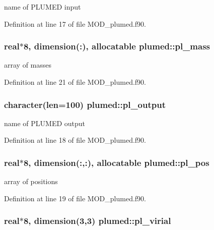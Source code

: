 name of P\-L\-U\-M\-E\-D input 



Definition at line 17 of file M\-O\-D\-\_\-plumed.\-f90.

\hypertarget{classplumed_aa02a55eef8aee0ddceb17c8b9dcf40c2}{
\subsubsection[{pl\-\_\-mass}]{\setlength{\rightskip}{0pt plus 5cm}real$\ast$8, dimension(\-:), allocatable plumed\-::pl\-\_\-mass}}\label{classplumed_aa02a55eef8aee0ddceb17c8b9dcf40c2}


array of masses 



Definition at line 21 of file M\-O\-D\-\_\-plumed.\-f90.

\hypertarget{classplumed_a2318a38b3aa942f80ae7dbe6b2c3f240}{
\subsubsection[{pl\-\_\-output}]{\setlength{\rightskip}{0pt plus 5cm}character(len=100) plumed\-::pl\-\_\-output}}\label{classplumed_a2318a38b3aa942f80ae7dbe6b2c3f240}


name of P\-L\-U\-M\-E\-D output 



Definition at line 18 of file M\-O\-D\-\_\-plumed.\-f90.

\hypertarget{classplumed_a12c6013d273e295dc9e85bd9521256be}{
\subsubsection[{pl\-\_\-pos}]{\setlength{\rightskip}{0pt plus 5cm}real$\ast$8, dimension(\-:,\-:), allocatable plumed\-::pl\-\_\-pos}}\label{classplumed_a12c6013d273e295dc9e85bd9521256be}


array of positions 



Definition at line 19 of file M\-O\-D\-\_\-plumed.\-f90.

\hypertarget{classplumed_a96e7d3b44d60f89f9d46d3c51c4c2ecf}{
\subsubsection[{pl\-\_\-virial}]{\setlength{\rightskip}{0pt plus 5cm}real$\ast$8, dimension(3,3) plumed\-::pl\-\_\-virial}}\label{classplumed_a96e7d3b44d60f89f9d46d3c51c4c2ecf}


